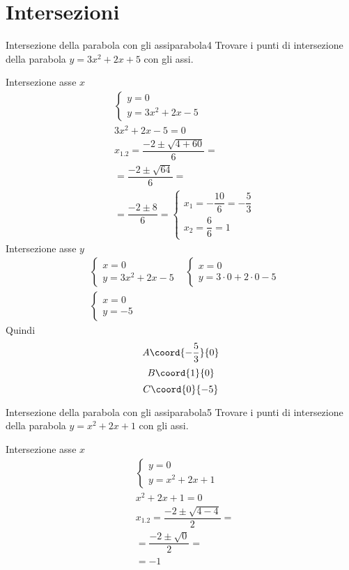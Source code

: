 \section{Intersezioni}
\begin{esempiot}{Intersezione della parabola con gli assi}{parabola4}
	Trovare i punti di intersezione della parabola $y=3x^2+2x+5$ con gli assi.
\end{esempiot}
Intersezione asse $x$
\begin{align*}
	&\begin{cases}
		y=0\\y=3x^2+2x-5
	\end{cases}\\
	&3x^2+2x-5=0\\
	&x_{1.2}=\dfrac{-2\pm\sqrt{4+60}}{6}=\\
	&=\dfrac{-2\pm\sqrt{64}}{6}=\\
	&=\dfrac{-2\pm 8}{6}=\begin{cases}
		x_1=-\dfrac{10}{6}=-\dfrac{5}{3}\\
		x_2=\dfrac{6}{6}=1
	\end{cases}
\end{align*}
Intersezione asse $y$
\begin{align*}
&\begin{cases}
	x=0\\y=3x^2+2x-5
\end{cases}&\begin{cases}
x=0\\y=3\cdot0+2\cdot 0-5
\end{cases}\\&\begin{cases}
x=0\\y=-5
\end{cases}
\end{align*}
Quindi \[A\coord{-\dfrac{5}{3}}{0} \] \[B\coord{1}{0} \] \[C\coord{0}{-5} \]
\begin{center}
	
	\label{fig:disegnoparabola4}
\end{center}
\begin{esempiot}{Intersezione della parabola con gli assi}{parabola5}
	Trovare i punti di intersezione della parabola $y=x^2+2x+1$ con gli assi.
\end{esempiot}
Intersezione asse $x$
\begin{align*}
	&\begin{cases}
		y=0\\y=x^2+2x+1
	\end{cases}\\
	&x^2+2x+1=0\\
	&x_{1.2}=\dfrac{-2\pm\sqrt{4-4}}{2}=\\
	&=\dfrac{-2\pm\sqrt{0}}{2}=\\
	&=-1
\end{align*}
